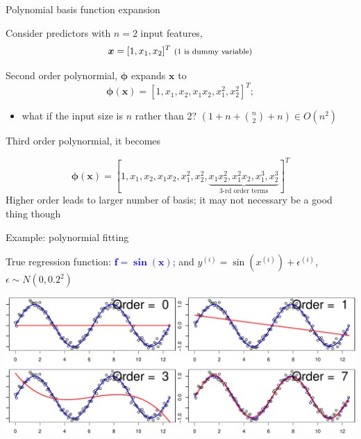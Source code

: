 \documentclass[ignorenonframetext,aspectratio=169]{beamer}
\providecommand{\tightlist}{%
  \setlength{\itemsep}{0pt}\setlength{\parskip}{0pt}}
\newcommand{\vv}[1]{\boldsymbol{#1}}
\newcommand{\di}[2]{\ensuremath{ #1^{(#2)}}}
\begin{document}
\begin{frame}{Polynomial basis function expansion}
\protect\hypertarget{polynomial-basis-function-expansion}{}

Consider predictors with \(n=2\) input features,
\[\vv{x} = [1, {x}_1, {x}_2]^T \text{ \footnotesize (1 is dummy variable)}\]

Second order polynormial, \(\vv{\phi}\) expands \(\vv{x}\) to
\[\vv{\phi}(\vv{x}) = [{1}, {x_1}, {x_2}, {x_1x_2}, {x_1^2}, {x_2^2}]^T;\]

\begin{itemize}
\tightlist
\item
  what if the input size is \(n\) rather than 2?
  \((1+n+\binom{n}{2}+n) \in O(n^2)\)
\end{itemize}

Third order polynormial, it becomes

\[\vv{\phi}(\vv{x}) = [{1}, {x_1}, {x_2}, {x_1x_2}, {x_1^2}, {x_2^2}, \underbrace{x_1x_2^2, x_1^2x_2, x_1^3, x_2^3}_{\text{3-rd order terms}}]^T\]
Higher order leads to larger number of basis; it may not necessary be a
good thing though

\end{frame}

\begin{frame}{Example: polynormial fitting}
\protect\hypertarget{example-polynormial-fitting}{}

True regression function: \textcolor{blue}{$\mathbf{f=\sin(x)}$}; and
\(\di{y}{i}= \sin(\di{x}{i}) + \di{\epsilon}{i}\),
\(\epsilon \sim N(0, 0.2^2)\) \vspace{0.5cm}

\begin{center}\includegraphics[width=1\linewidth]{lecture10_files/figure-beamer/unnamed-chunk-8-1} \end{center}

\end{frame}
\end{document}

